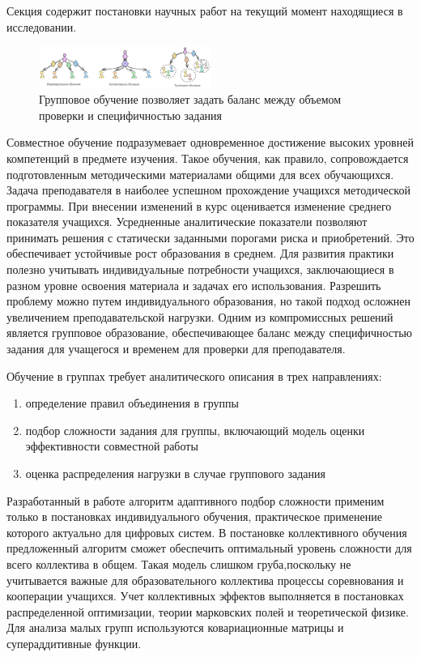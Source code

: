 Секция содержит постановки научных работ на текущий момент находящиеся в исследовании. 

\begin{figure}[h]
    \centering
    \includegraphics[width=0.5\textwidth]{assets/final/setting.excalidraw.png}
    \caption{Групповое обучение позволяет задать баланс между объемом проверки и специфичностью задания}
    \label{group_learning}
\end{figure}

Совместное обучение подразумевает одновременное достижение высоких уровней компетенций в предмете изучения.
Такое обучения, как правило, сопровождается подготовленным методическими материалами общими для всех обучающихся.
Задача преподавателя в наиболее успешном прохождение учащихся методической программы. При внесении изменений
в курс оценивается изменение среднего показателя учащихся. Усредненные аналитические показатели позволяют принимать решения с статически заданными
порогами риска и приобретений. Это обеспечивает устойчивые рост образования в среднем. Для развития практики
полезно учитывать индивидуальные потребности учащихся, заключающиеся в разном уровне освоения материала и задачах его использования. Разрешить проблему
можно путем индивидуального образования, но такой подход осложнен увеличением преподавательской нагрузки. Одним из компромиссных решений является групповое образование,
обеспечивающее баланс между специфичностью задания для учащегося и временем для проверки для преподавателя.

Обучение в группах требует аналитического описания в трех направлениях: \begin{enumerate}
    \item определение правил объединения в группы
    \item подбор сложности задания для группы, включающий модель оценки эффективности совместной работы
    \item оценка распределения нагрузки в случае группового задания
\end{enumerate}

Разработанный в работе алгоритм адаптивного подбор сложности применим только в постановках индивидуального обучения, практическое применение которого
актуально для цифровых систем. В постановке коллективного обучения предложенный алгоритм сможет обеспечить оптимальный уровень сложности для всего коллектива в общем.
Такая модель слишком груба,поскольку не учитывается важные для образовательного коллектива процессы соревнования и кооперации учащихся. Учет коллективных эффектов
выполняется в постановках распределенной оптимизации, теории марковских полей и теоретической физике. Для анализа малых групп используются 
ковариационные матрицы и супераддитивные функции. 

